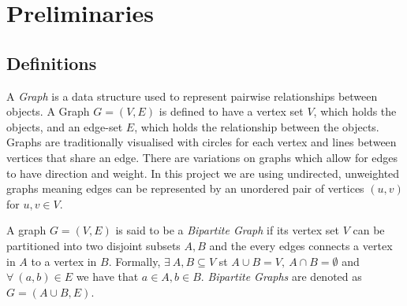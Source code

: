 \documentclass[11pt,twoside,a4paper]{report}
\begin{document}
\chapter{Preliminaries}

\setcounter{page}{1} %

\section{Definitions}


A \textit{Graph} is a data structure used to represent pairwise relationships between objects. A Graph $G=(V,E)$ is defined to have a vertex set $V$, which holds the objects, and an edge-set $E$, which holds the relationship between the objects. Graphs are traditionally visualised with circles for each vertex and lines between vertices that share an edge. There are variations on graphs which allow for edges to have direction and weight. In this project we are using undirected, unweighted graphs meaning edges can be represented by an unordered pair of vertices $(u,v)$ for $u,v\in V$.

\par A graph $G=(V,E)$ is said to be a \textit{Bipartite Graph} if its vertex set $V$ can be partitioned into two disjoint subsets $A,B$ and the every edges connects a vertex in $A$ to a vertex in $B$. Formally, $\exists\ A,B\subseteq V$ st $A\cup B=V,\ A\cap B=\emptyset$ and $\forall\ (a,b)\in E$ we have that $a\in A,b\in B$. \textit{Bipartite Graphs} are denoted as $G=(A\cup B,E)$.
\end{document}
